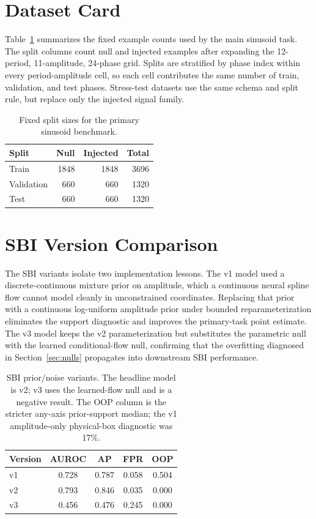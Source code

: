 \documentclass{article}
\begin{document}
\section{Dataset Card}\label{app:dataset-card}

Table~\ref{tab:dataset-card} summarizes the fixed example counts used by the main sinusoid task.  The split columns count null and injected examples after expanding the 12-period, 11-amplitude, 24-phase grid.  Splits are stratified by phase index within every period-amplitude cell, so each cell contributes the same number of train, validation, and test phases.  Stress-test datasets use the same schema and split rule, but replace only the injected signal family.

\begin{table}[h!]
  \centering
  \footnotesize
  \caption{Fixed split sizes for the primary sinusoid benchmark.}
  \label{tab:dataset-card}
  \begin{tabular}{lrrr}
    \toprule
    Split & Null & Injected & Total \\
    \midrule
    Train & 1848 & 1848 & 3696 \\
    Validation & 660 & 660 & 1320 \\
    Test & 660 & 660 & 1320 \\
    \bottomrule
  \end{tabular}
\end{table}

\section{SBI Version Comparison}\label{app:sbi-versions}

The SBI variants isolate two implementation lessons.  The v1 model used a discrete-continuous mixture prior on amplitude, which a continuous neural spline flow cannot model cleanly in unconstrained coordinates.  Replacing that prior with a continuous log-uniform amplitude prior under bounded reparameterization eliminates the support diagnostic and improves the primary-task point estimate.  The v3 model keeps the v2 parameterization but substitutes the parametric null with the learned conditional-flow null, confirming that the overfitting diagnosed in Section~\ref{sec:nulls} propagates into downstream SBI performance.

\begin{table}[h!]
  \centering
  \scriptsize
  \caption{SBI prior/noise variants.  The headline model is v2; v3 uses the learned-flow null and is a negative result.  The OOP column is the stricter any-axis prior-support median; the v1 amplitude-only physical-box diagnostic was 17\%.}
  \label{tab:sbi-versions}
  \begin{tabular}{lcccc}
    \toprule
    Version & AUROC & AP & FPR & OOP \\
    \midrule
    v1 & 0.728 & 0.787 & 0.058 & 0.504 \\
    v2 & 0.793 & 0.846 & 0.035 & 0.000 \\
    v3 & 0.456 & 0.476 & 0.245 & 0.000 \\
    \bottomrule
  \end{tabular}
\end{table}
\end{document}
